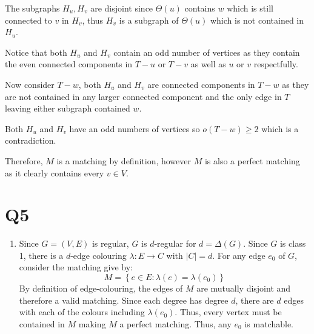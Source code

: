 \documentclass[a4paper, 11pt]{article}
\def\set#1{\left\{ #1 \right\}}
\begin{document}
\begin{multicols*}{2}
\begin{mdframed}
		The subgraphs $H_u,H_v$ are disjoint since $\Theta(u)$ contains $w$ which is still connected to $v$ in $H_v$, thus $H_v$ is a subgraph of $\Theta(u)$ which is not contained in $H_u$.

		Notice that both $H_u$ and $H_v$ contain an odd number of vertices as they contain the even connected components in $T-u$ or $T-v$ as well as $u$ or $v$ respectfully.

		Now consider $T-w$, both $H_u$ and $H_v$ are connected components in $T-w$ as they are not contained in any larger connected component and the only edge in $T$ leaving either subgraph contained $w$.

		Both $H_u$ and $H_v$ have an odd numbers of vertices so $o(T-w)\geq 2$ which is a contradiction.
	\end{mdframed}

	Therefore, $M$ is a matching by definition, however $M$ is also a perfect matching as it clearly contains every $v\in V$.





	\section*{Q5}

	\begin{enumerate}[label=(\alph*)]
		\item
		      Since $G=(V,E)$ is regular, $G$ is $d$-regular for $d=\Delta(G)$. Since $G$ is class 1, there is a $d$-edge colouring $\lambda: E\to C$ with $|C|=d$. For any edge $e_0$ of $G$, consider the matching give by:
		      $$M= \set{e\in E : \lambda(e)=\lambda(e_0)}$$
		      By definition of edge-colouring, the edges of $M$ are mutually disjoint and therefore a valid matching. Since each degree has degree $d$, there are $d$ edges with each of the colours including $\lambda(e_0)$. Thus, every vertex must be contained in $M$ making $M$ a perfect matching. Thus, any $e_0$ is matchable.


\end{enumerate}
\end{multicols*}
\end{document}
